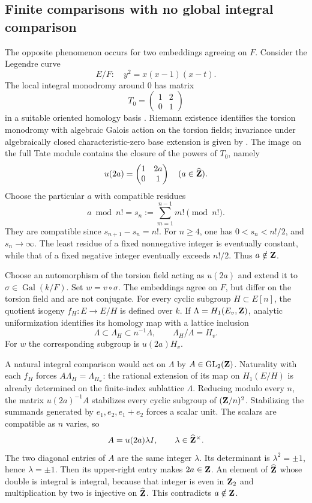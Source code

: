 \documentclass[11pt]{article}
\theoremstyle{definition}\newtheorem{definition}[theorem]{Definition}
\theoremstyle{remark}\newtheorem{remark}[theorem]{Remark}
\DeclareMathOperator{\Gal}{Gal}\DeclareMathOperator{\im}{im}
\begin{document}
\subsection{Finite comparisons with no global integral comparison}
The opposite phenomenon occurs for two embeddings agreeing on $F$. Consider the Legendre curve
\[
                     E/F:\quad y^2=x(x-1)(x-t).
\]
The local integral monodromy around $0$ has matrix
\[
                    T_0=\begin{pmatrix}1&2\\0&1\end{pmatrix}
\]
in a suitable oriented homology basis \cite[Example 5.2, pp.~16--17]{LocalSystems}. Riemann existence identifies the torsion monodromy with algebraic Galois action on the torsion fields; invariance under algebraically closed characteristic-zero base extension is given by \cite[Theorem 1.1]{Landesman}. The image on the full Tate module contains the closure of the powers of $T_0$, namely
\[
                  u(2a)=\begin{pmatrix}1&2a\\0&1\end{pmatrix}
                         \quad(a\in\widehat{\mathbf Z}).
\]
Choose the particular $a$ with compatible residues
\[
            a\bmod n!=s_n:=\sum_{m=1}^{n-1}m!\pmod{n!}.
\]
They are compatible since $s_{n+1}-s_n=n!$. For $n\ge4$, one has $0<s_n<n!/2$, and $s_n\to\infty$. The least residue of a fixed nonnegative integer is eventually constant, while that of a fixed negative integer eventually exceeds $n!/2$. Thus $a\notin\mathbf Z$.

Choose an automorphism of the torsion field acting as $u(2a)$ and extend it to $\sigma\in\Gal(k/F)$. Set $w=v\circ\sigma$. The embeddings agree on $F$, but differ on the torsion field and are not conjugate. For every cyclic subgroup $H\subset E[n]$, the quotient isogeny $f_H:E\to E/H$ is defined over $k$. If $\Lambda=H_1(E_v,\mathbf Z)$, analytic uniformization identifies its homology map with a lattice inclusion
\[
                 \Lambda\subset\Lambda_H\subset n^{-1}\Lambda,
                    \qquad\Lambda_H/\Lambda=H_v.
\]
For $w$ the corresponding subgroup is $u(2a)H_v$.

A natural integral comparison would act on $\Lambda$ by $A\in\operatorname{GL}_2(\mathbf Z)$. Naturality with each $f_H$ forces $A\Lambda_H=\Lambda_{H_w}$: the rational extension of its map on $H_1(E/H)$ is already determined on the finite-index sublattice $\Lambda$. Reducing modulo every $n$, the matrix $u(2a)^{-1}A$ stabilizes every cyclic subgroup of $(\mathbf Z/n)^2$. Stabilizing the summands generated by $e_1,e_2,e_1+e_2$ forces a scalar unit. The scalars are compatible as $n$ varies, so
\[
                         A=u(2a)\lambda I,\qquad
                            \lambda\in\widehat{\mathbf Z}^\times.
\]
The two diagonal entries of $A$ are the same integer $\lambda$. Its determinant is $\lambda^2=\pm1$, hence $\lambda=\pm1$. Then its upper-right entry makes $2a\in\mathbf Z$. An element of $\widehat{\mathbf Z}$ whose double is integral is integral, because that integer is even in $\mathbf Z_2$ and multiplication by two is injective on $\widehat{\mathbf Z}$. This contradicts $a\notin\mathbf Z$.
\end{document}
